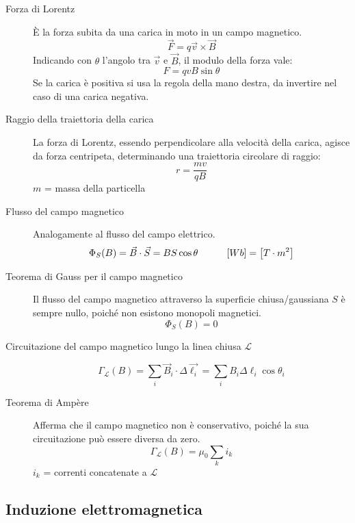 \documentclass[a4paper,11pt,italian]{article}
\begin{document}
\begin{description}
  \item[Forza di Lorentz] 
  È la forza subita da una carica in moto in un campo magnetico.
  \[ \vec{F} = q \vec{v} \times \vec{B} \]
  Indicando con $ \theta $ l'angolo tra $ \vec{v} $ e $ \vec{B} $, il modulo della forza vale:
  \[ F = qvB\sin \theta \]
  Se la carica è positiva si usa la regola della mano destra, da invertire nel caso di una carica negativa.
  
  \item[Raggio della traiettoria della carica] 
  La forza di Lorentz, essendo perpendicolare alla velocità della carica, agisce da forza centripeta, determinando una traiettoria circolare di raggio:
  \[ r = \frac{mv}{qB} \]
  $ m $ = massa della particella

  
  \item[Flusso del campo magnetico] 
  Analogamente al flusso del campo elettrico.
  \[ \Phi_S(B) = \vec{B} \cdot \vec{S} = B S \cos \theta \hspace*{3em} [Wb] = \left[ T \cdot m^2 \right] \]
  
  \item[Teorema di Gauss per il campo magnetico] 
  Il flusso del campo magnetico attraverso la superficie chiusa/gaussiana $ S $ è sempre nullo, poiché non esistono monopoli magnetici.
  \[ \Phi_S(B) = 0 \]
  
  \item[Circuitazione del campo magnetico lungo la linea chiusa $ \mathscr{L} $]\label{conc:circuitazioneB}
  \[ \Gamma_\mathscr{L}(B) = \sum_i \vec{B}_i \cdot \Delta\vec{\ell_i} = \sum_i B_i \Delta \ell_i \cos \theta_i \]
  
  \item[Teorema di Ampère] 
  Afferma che il campo magnetico non è conservativo, poiché la sua circuitazione può essere diversa da zero.
  \[ \Gamma_\mathscr{L}(B) = \mu_0 \sum_k i_k \]
  $ i_k $ = correnti concatenate a $ \mathscr{L} $
\end{description}

\subsection{Induzione elettromagnetica}
\end{document}
